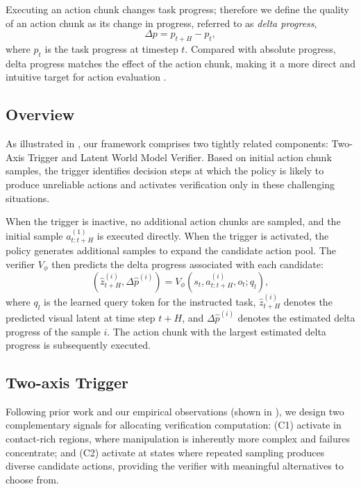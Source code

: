 \documentclass[10pt,twocolumn,letterpaper]{article}
\begin{document}
Executing an action chunk changes task progress; therefore we define the quality of an action chunk as its change in progress, referred to as \textit{delta progress},
\begin{equation}
    \Delta p = p_{t+H} - p_t,
\end{equation}
where $p_t$ is the task progress at timestep $t$. Compared with absolute progress, delta progress matches the effect of the action chunk, making it a more direct and intuitive target for action evaluation \cite{chen2025robotwin20scalabledata}.

\subsection{Overview}

As illustrated in , our framework comprises two tightly related components: Two-Axis Trigger and Latent World Model Verifier. Based on initial action chunk samples, the trigger identifies decision steps at which the policy is likely to produce unreliable actions and activates verification only in these challenging situations.

When the trigger is inactive, no additional action chunks are sampled, and the initial sample $a^{(1)}_{t:t+H}$ is executed directly. When the trigger is activated, the policy generates additional samples to expand the candidate action pool. The verifier $V_\phi$ then predicts the delta progress associated with each candidate:
\begin{equation}
    \left(\hat{z}_{t+H}^{(i)}, \Delta \hat{p}^{(i)}\right)
    = V_\phi\left(s_t, a^{(i)}_{t:t+H}, o_t; q_l\right),
\end{equation}
where $q_l$ is the learned query token for the instructed task, $\hat{z}_{t+H}^{(i)}$ denotes the predicted visual latent at time step $t+H$, and $\Delta \hat{p}^{(i)}$ denotes the estimated delta progress of the sample $i$. The action chunk with the largest estimated delta progress is subsequently executed.

\subsection{Two-axis Trigger}
\label{sec:trigger}

Following prior work \cite{hu2024adaflowimitationlearningvarianceadaptive, fan2026dreamavoidcriticalphasetesttimedreaming} and our empirical observations (shown in ), we design two complementary signals for allocating verification computation: (C1) activate in contact-rich regions, where manipulation is inherently more complex \cite{pang2023globalplanningcontactrichmanipulation} and failures concentrate; and (C2) activate at states where repeated sampling produces diverse candidate actions, providing the verifier with meaningful alternatives to choose from.
\end{document}
